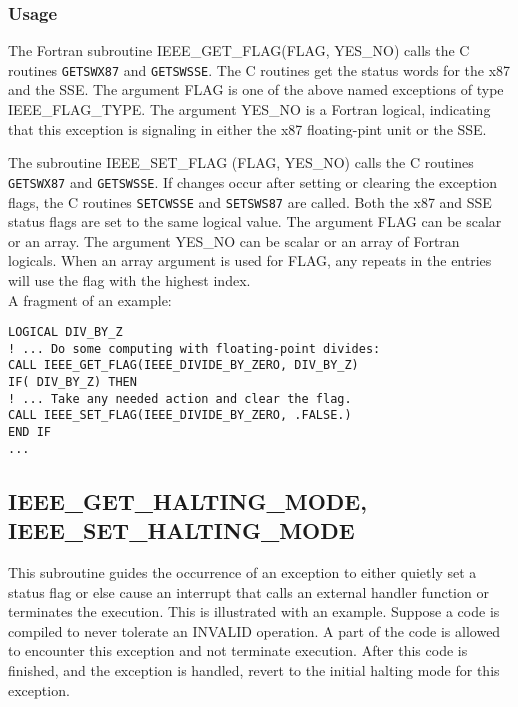 \documentclass[12pt]{article}
\begin{document}
\subsubsection{Usage}
The Fortran subroutine  IEEE\_GET\_FLAG(FLAG, YES\_NO) calls the C routines {\tt GETSWX87} and {\tt GETSWSSE}. 
The C routines get the status words for the x87 and the SSE.  The argument FLAG is one of the above named exceptions
of type  IEEE\_FLAG\_TYPE.  The argument YES\_NO is a Fortran logical, indicating that this exception is signaling in either the x87 floating-pint unit or the SSE.

The subroutine IEEE\_SET\_FLAG (FLAG, YES\_NO) calls the C routines {\tt GETSWX87} and {\tt GETSWSSE}. If
changes occur after setting or clearing the exception flags, the C routines {\tt SETCWSSE} and {\tt SETSWS87} are
called.  Both the x87 and SSE status flags are set to the same logical value.  The argument FLAG can be scalar or an array.  The argument YES\_NO can be scalar or an array of Fortran logicals.  When an array argument is used for FLAG, any repeats in the entries will use the flag with the highest index.\\

A fragment of an example:

{\tt     LOGICAL DIV\_BY\_Z\\
 ! ... Do some computing with floating-point divides:\\
       CALL IEEE\_GET\_FLAG(IEEE\_DIVIDE\_BY\_ZERO,  DIV\_BY\_Z)\\
       IF( DIV\_BY\_Z) THEN\\
! ... Take any needed action and clear the flag.\\
       CALL IEEE\_SET\_FLAG(IEEE\_DIVIDE\_BY\_ZERO, .FALSE.)\\ 
       END IF\\     
 ...
 }
 \subsection{IEEE\_GET\_HALTING\_MODE, IEEE\_SET\_HALTING\_MODE}
 This subroutine guides  the occurrence of an exception to either quietly set a status flag or else cause an interrupt that calls an external handler function or terminates the execution.  This is illustrated with an example.  Suppose  a code is compiled to never tolerate  an INVALID operation.  A part of the code is allowed to encounter this exception and not terminate execution.  After this  code is finished, and the exception is handled, revert to the initial halting mode for this exception.\\
 
\end{document}
